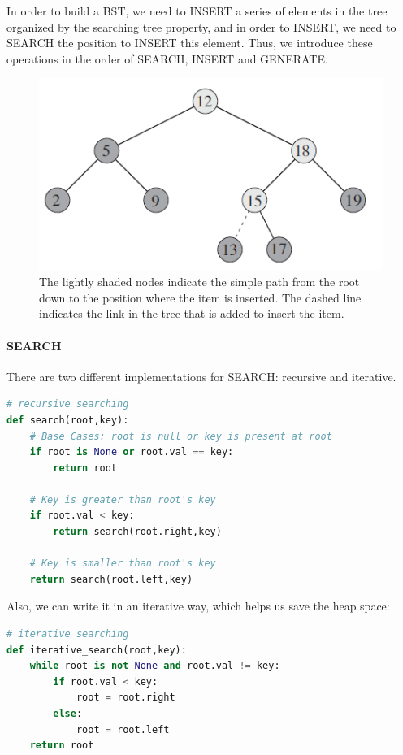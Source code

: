 \documentclass[data-structure.tex]{subfiles}
\begin{document}

In order to build a BST, we need to INSERT a series of elements in the tree organized by the searching tree property, and in order to INSERT, we need to SEARCH the position to INSERT this element. Thus, we introduce these operations in the order of SEARCH, INSERT and GENERATE. 
\begin{figure}[h]
    \centering
    \includegraphics[width=0.6\columnwidth]{fig/bst_insertion.png}
    \caption{The lightly shaded nodes indicate the simple path from the root down to the position where the item is inserted. The dashed line indicates the link in the tree that is added to insert the item. }
    \label{fig:bst_operation}
\end{figure}
\paragraph{SEARCH}

There are two different implementations for SEARCH: recursive and iterative.
\begin{lstlisting}[language = Python]
# recursive searching
def search(root,key):
    # Base Cases: root is null or key is present at root
    if root is None or root.val == key:
        return root
 
    # Key is greater than root's key
    if root.val < key:
        return search(root.right,key)
   
    # Key is smaller than root's key
    return search(root.left,key)
\end{lstlisting}
Also, we can write it in an iterative way, which helps us save the heap space: 
\begin{lstlisting}[language = Python]
# iterative searching
def iterative_search(root,key):
    while root is not None and root.val != key:
        if root.val < key:
            root = root.right
        else:
            root = root.left
    return root
\end{lstlisting}
\end{document}
